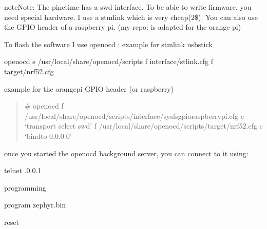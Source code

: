 \documentclass[letterpaper,10pt,english]{sphinxmanual}
\begin{document}
\begin{sphinxadmonition}{note}{Note:}
The pinetime has a swd interface.
To be able to write firmware,  you need special hardware.
I use a stm\sphinxhyphen{}link which is very cheap(2\$).
You can also use the GPIO header of a raspberry pi.
(my repo:  is adapted for the orange pi)
\end{sphinxadmonition}

To flash the software I use openocd :
example for stm\sphinxhyphen{}link usb\sphinxhyphen{}stick

\begin{sphinxVerbatim}[commandchars=\\\{\}]
 openocd \PYGZhy{}s /usr/local/share/openocd/scripts \PYGZhy{}f interface/stlink.cfg \PYGZhy{}f target/nrf52.cfg
\end{sphinxVerbatim}

example for the orange\sphinxhyphen{}pi GPIO header (or raspberry)
\begin{quote}

\# openocd \sphinxhyphen{}f /usr/local/share/openocd/scripts/interface/sysfsgpio\sphinxhyphen{}raspberrypi.cfg
\sphinxhyphen{}c ‘transport select swd’ \sphinxhyphen{}f /usr/local/share/openocd/scripts/target/nrf52.cfg
\sphinxhyphen{}c ‘bindto 0.0.0.0’
\end{quote}

once you started the openocd background server, you can connect to it using:

\begin{sphinxVerbatim}[commandchars=\\\{\}]
telnet .0.0.1 
\end{sphinxVerbatim}

programming

\begin{sphinxVerbatim}[commandchars=\\\{\}]
\PYG{g+go}{Escape character is \PYGZsq{}\PYGZca{}]\PYGZsq{}.}
 program zephyr.bin


reset
\end{sphinxVerbatim}
\end{document}
